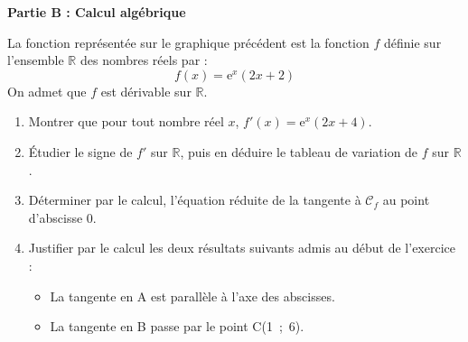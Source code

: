 \documentclass[10pt]{article}
\providecommand{\R}{\mathbb{R}}
\providecommand{\e}{{\mathrm{e}}}
\begin{document}
\textbf{Partie B : Calcul algébrique}

\medskip

La fonction représentée sur le graphique précédent est la fonction $f$ définie 
sur l'ensemble $\R$ des nom\-bres réels par : \[f(x)=\e^x(2x + 2)\]
On admet que $f$ est dérivable sur $\R$.

\medskip

\begin{enumerate}[resume]
\item Montrer que pour tout nombre réel $x$, $f'(x)=\e^x(2x + 4)$.
\item Étudier le signe de $f'$ sur $\R$, puis en déduire le tableau de variation de $f$ sur $\R$.
\item Déterminer par le calcul, l'équation réduite de la tangente à $\mathcal{C}_f$ au point d'abscisse 0.
\item Justifier par le calcul les deux résultats suivants admis au début de l'exercice :
\begin{itemize}
\item La tangente en A est parallèle à l'axe des abscisses.
\item La tangente en B passe par le point C(1~;~6).
\end{itemize}
\end{enumerate}
\end{document}
